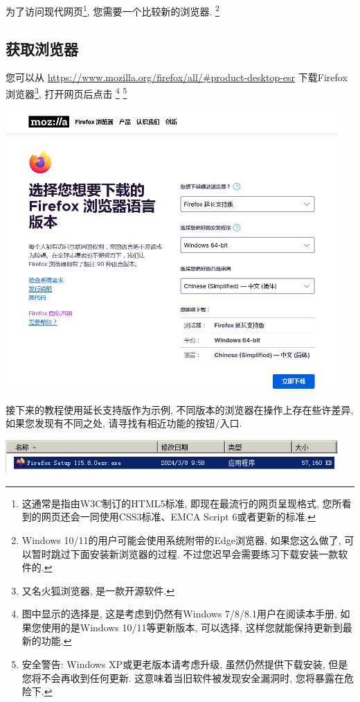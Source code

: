 为了访问现代网页\footnote{这通常是指由W3C制订的HTML5标准, 即现在最流行的网页呈现格式, 您所看到的网页还会一同使用CSS3标准、EMCA Script 6或者更新的标准. }, 您需要一个比较新的浏览器. \footnote{Windows 10/11的用户可能会使用系统附带的Edge浏览器, 如果您这么做了, 可以暂时跳过下面安装新浏览器的过程. 不过您迟早会需要练习下载安装一款软件的. }

\subsection{获取浏览器}

您可以从 \url{https://www.mozilla.org/firefox/all/\#product-desktop-esr} 下载Firefox浏览器\footnote{又名火狐浏览器, 是一款开源软件. }, 打开网页后点击 
\footnote{图中显示的选择是, 这是考虑到仍然有Windows
7/8/8.1用户在阅读本手册, 如果您使用的是Windows
10/11等更新版本, 可以选择, 这样您就能保持更新到最新的功能. }
\footnote{安全警告: Windows XP或更老版本请考虑升级, 虽然仍然提供下载安装, 但是您将不会再收到任何更新. 这意味着当旧软件被发现安全漏洞时, 您将暴露在危险下. }

\includegraphics[width=5in]{media/image2.png}

接下来的教程使用延长支持版作为示例, 不同版本的浏览器在操作上存在些许差异, 如果您发现有不同之处, 请寻找有相近功能的按钮/入口. 

\includegraphics[width=5in]{media/image3.png}

